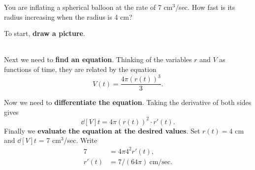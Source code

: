 \begin{example}
    You are inflating a spherical balloon at the rate of 7 cm${}^3$/sec.  How
    fast is its radius increasing when the radius is 4 cm? \cite{mooc}\\
    
    \begin{solution}
    To start, \textbf{draw a picture}.\\
    
    \begin{figure}[H]
        \centering
\end{figure}
    ~\\
    Next we need to \textbf{find an equation}.  Thinking of the variables
    $r$ and $V$ as functions of time, they are related by the equation
    \[
    V(t)=\frac{4\pi (r(t))^3}{3}.
    \]
    
    Now we need to \textbf{differentiate the equation}.  Taking the
    derivative of both sides gives 
    \[
    \dd[V]{t}=4\pi (r(t))^2\cdot r'(t).
    \]  
    Finally we \textbf{evaluate the equation at the desired values}. Set
    $r(t)= 4$ cm and $\dd[V]{t}$ = 7 cm$^3$/sec. Write 
    \begin{align*}
    7 &=4\pi 4^2r'(t),\\
    r'(t) &=7/(64\pi)~\text{cm/sec}.
    \end{align*}
    \end{solution}
\end{example}
    
